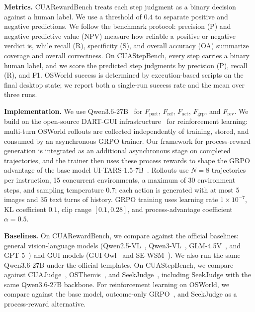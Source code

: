 \textbf{Metrics.}
CUARewardBench treats each step judgment as a binary decision against a human label. We use a threshold of $0.4$ to separate positive and negative predictions. We follow the benchmark protocol: precision (P) and negative predictive value (NPV) measure how reliable a positive or negative verdict is, while recall (R), specificity (S), and overall accuracy (OA) summarize coverage and overall correctness.
On CUAStepBench, every step carries a binary human label, and we score the predicted step judgments by precision (P), recall (R), and F1.
OSWorld success is determined by execution-based scripts on the final desktop state; we report both a single-run success rate and the mean over three runs.

\textbf{Implementation.}
We use Qwen3.6-27B~\cite{qwen2026qwen36} for $F_{\mathrm{part}}$, $F_{\mathrm{ref}}$, $F_{\mathrm{act}}$, $F_{\mathrm{grp}}$, and $F_{\mathrm{rev}}$. 
We build on the open-source DART-GUI infrastructure~\cite{li2025dart} for reinforcement learning: multi-turn OSWorld rollouts are collected independently of training, stored, and consumed by an asynchronous GRPO trainer. Our framework for process-reward generation is integrated as an additional asynchronous stage on completed trajectories, and the trainer then uses these process rewards to shape the GRPO advantage of the base model UI-TARS-1.5-7B~\cite{qin2025ui}.
Rollouts use $N=8$ trajectories per instruction, 15 concurrent environments, a maximum of 30 environment steps, and sampling temperature $0.7$; each action is generated with at most 5 images and 35 text turns of history. GRPO training uses learning rate $1\times 10^{-7}$, KL coefficient $0.1$, clip range $[0.1,0.28]$, and process-advantage coefficient $\alpha=0.5$.

\textbf{Baselines.}
On CUARewardBench, we compare against the official baselines: general vision-language models (Qwen2.5-VL~\cite{bai2025qwen25vl}, Qwen3-VL~\cite{bai2025qwen3vl}, GLM-4.5V~\cite{hong2025glm45v}, and GPT-5~\cite{openai2025gpt5}) and GUI models (GUI-Owl~\cite{ye2025guiowl} and SE-WSM~\cite{sun2025seagent}). We also run the same Qwen3.6-27B under the official templates.
On CUAStepBench, we compare against CUAJudge~\cite{xue2026cuajudge}, OSThemis~\cite{li2026osthemis}, and SeekJudge~\cite{wan2026seekjudge}, including SeekJudge with the same Qwen3.6-27B backbone.
For reinforcement learning on OSWorld, we compare against the base model, outcome-only GRPO~\cite{shao2024deepseekmath}, and SeekJudge as a process-reward alternative.

